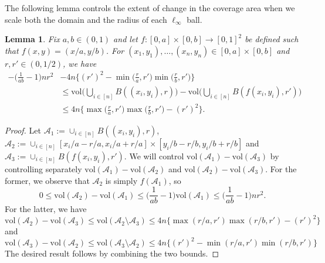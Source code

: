 \documentclass[11pt]{article}
\newtheorem{lemma}[thm]{Lemma}
\newcommand{\vol}{\mathrm{vol}}
\begin{document}
The following lemma controls the extent of change in the coverage area when we scale both the domain and the radius of each $\ell_\infty$ ball. 
\begin{lemma}
    \label{Lemma:VolumeScale} 
    Fix $a,b\in(0,1)$ and let $f:[0,a]\times [0,b]\to[0,1]^2$ be defined such that $f(x,y) = (x/a,y/b)$.  
    For $(x_1,y_1),\ldots,(x_n,y_n)\in [0,a]\times [0,b]$ and $r,r'\in(0,1/2)$, we have 
    \begin{align*}
    -\biggl(\frac{1}{ab}-1\biggr)nr^2&- 4n\biggl\{(r')^2 - \min\biggl(\frac{r}{a}, r'\biggr)\min\biggl(\frac{r}{b}, r'\biggr) \biggr\}\\
    &\leq \vol\biggl(\bigcup_{i\in[n]}B((x_i,y_i), r)\biggr) - \vol\biggl(\bigcup_{i\in[n]}B(f(x_i,y_i), r')\biggr)\\
    &\leq 4n\biggl\{\max\biggl(\frac{r}{a}, r'\biggr)\max\biggl(\frac{r}{b}, r'\biggr) - (r')^2\biggr\}.
    \end{align*}
\end{lemma}
\begin{proof}
    Let $\mathcal{A}_1 := \cup_{i\in[n]} B((x_i,y_i),r)$, $\mathcal{A}_2 := \cup_{i\in[n]} [x_i/a - r/a, x_i/a+r/a]\times [y_i/b-r/b, y_i/b+r/b]$ and $\mathcal{A}_3:=\cup_{i\in[n]} B(f(x_i,y_i), r')$. We will control $\vol(\mathcal{A}_1)-\vol(\mathcal{A}_3)$ by controlling separately $\vol(\mathcal{A}_1)-\vol(\mathcal{A}_2)$ and $\vol(\mathcal{A}_2)-\vol(\mathcal{A}_3)$. For the former, we observe that $\mathcal{A}_2$ is simply $f(\mathcal{A}_1)$, so 
    \[
    0\leq \vol(\mathcal{A}_2)-\vol(\mathcal{A}_1)\leq \biggl(\frac{1}{ab}-1\biggr)\vol(\mathcal{A}_1) \leq \biggl(\frac{1}{ab}-1\biggr)nr^2.
    \]
    For the latter, we have 
    \[
    \vol(\mathcal{A}_2) - \vol(\mathcal{A}_3) \leq \vol(\mathcal{A}_2 \setminus \mathcal{A}_3)\leq 4n\bigl\{\max(r/a, r')\max(r/b, r') - (r')^2\bigr\}
    \]
    and 
    \[  
    \vol(\mathcal{A}_3) - \vol(\mathcal{A}_2) \leq \vol(\mathcal{A}_3 \setminus \mathcal{A}_2) \leq 4n\bigl\{(r')^2 - \min(r/a, r')\min(r/b, r') \bigr\}
    \]
    The desired result follows by combining the two bounds.
\end{proof}
\end{document}
